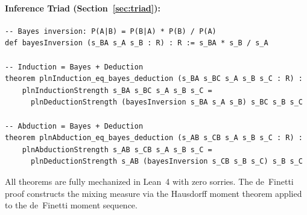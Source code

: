 \documentclass[]{article}
\begin{document}
\paragraph{Inference Triad (Section~\ref{sec:triad}):}
\begin{lstlisting}[basicstyle=\scriptsize\ttfamily,frame=single,numbers=none]
-- Bayes inversion: P(A|B) = P(B|A) * P(B) / P(A)
def bayesInversion (s_BA s_A s_B : R) : R := s_BA * s_B / s_A

-- Induction = Bayes + Deduction
theorem plnInduction_eq_bayes_deduction (s_BA s_BC s_A s_B s_C : R) :
    plnInductionStrength s_BA s_BC s_A s_B s_C =
      plnDeductionStrength (bayesInversion s_BA s_A s_B) s_BC s_B s_C

-- Abduction = Bayes + Deduction
theorem plnAbduction_eq_bayes_deduction (s_AB s_CB s_A s_B s_C : R) :
    plnAbductionStrength s_AB s_CB s_A s_B s_C =
      plnDeductionStrength s_AB (bayesInversion s_CB s_B s_C) s_B s_C
\end{lstlisting}

All theorems are fully mechanized in Lean~4 with zero sorries.  The
de~Finetti proof constructs the mixing measure via the Hausdorff moment
theorem applied to the de~Finetti moment sequence.



\end{document}
